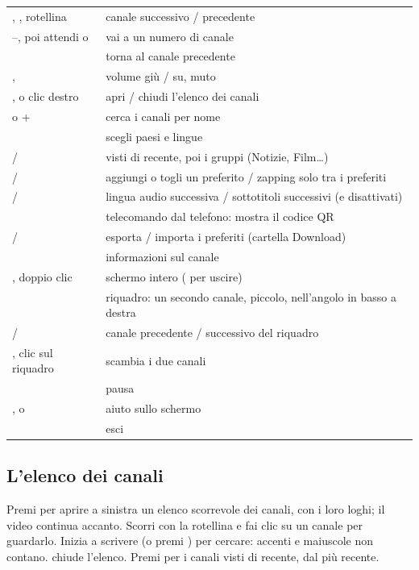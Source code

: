 \begin{xltabular}{\linewidth}{@{}KX@{}}
\key{$\uparrow$} \key{$\downarrow$},  , rotellina & canale successivo / precedente \\
--, poi attendi o  & vai a un numero di canale \\
 & torna al canale precedente \\
\key{$\leftarrow$} \key{$\rightarrow$},  & volume giù / su, muto \\
,  o clic destro & apri / chiudi l'elenco dei canali \\
\key{/} o + & cerca i canali per nome \\
 & scegli paesi e lingue \\
 /  & visti di recente, poi i gruppi (Notizie, Film\ldots) \\
 /  & aggiungi o togli un preferito / zapping solo tra i preferiti \\
 /  & lingua audio successiva / sottotitoli successivi (e disattivati) \\
 & telecomando dal telefono: mostra il codice QR \\
 /  & esporta / importa i preferiti (cartella Download) \\
 & informazioni sul canale \\
, doppio clic & schermo intero ( per uscire) \\
 & riquadro: un secondo canale, piccolo, nell'angolo in basso a destra \\
\key{[} / \key{]} & canale precedente / successivo del riquadro \\
, clic sul riquadro & scambia i due canali \\
 & pausa \\
,  o  & aiuto sullo schermo \\
 & esci \\
\bottomrule
\end{xltabular}

\subsection{L'elenco dei canali}
Premi  per aprire a sinistra un elenco scorrevole dei canali, con i
loro loghi; il video continua accanto. Scorri con la rotellina e fai clic su
un canale per guardarlo. Inizia a scrivere (o premi \key{/}) per cercare:
accenti e maiuscole non contano.  chiude l'elenco. Premi  per
i canali visti di recente, dal più recente.

